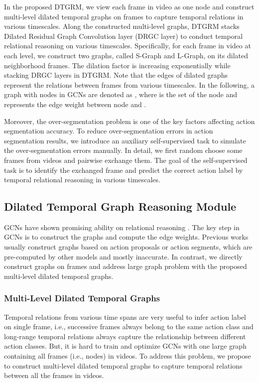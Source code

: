 \documentclass[letterpaper]{article} \usepackage{aaai21}  \usepackage{times}  \usepackage{helvet} \usepackage{courier}  \usepackage[hyphens]{url}  \usepackage{graphicx} \usepackage{mathtools}
\begin{document}
In the proposed DTGRM, we view each frame in video as one node and construct multi-level dilated temporal graphs on frames to capture temporal relations in various timescales. Along the constructed multi-level graphs, DTGRM stacks  Dilated Residual Graph Convolution layer (DRGC layer) to conduct temporal relational reasoning on various timescales. Specifically, for each frame in video at each level, we construct two graphs, called S-Graph and L-Graph, on its dilated neighborhood frames. The dilation factor is increasing exponentially while stacking DRGC layers in DTGRM. Note that the edges of dilated graphs represent the relations between frames from various timescales. In the following, a graph with  nodes in GCNs are denoted as , where  is the set of the node  and  represents the edge weight between node  and .

Moreover, the over-segmentation problem \cite{lea2016learning} is one of the key factors affecting action segmentation accuracy. To reduce over-segmentation errors in action segmentation results, we introduce an auxiliary self-supervised task to simulate the over-segmentation errors manually. In detail, we first random choose some frames from videos and pairwise exchange them. The goal of the self-supervised task is to identify the exchanged frame and predict the correct action label by temporal relational reasoning in various timescales.

\subsection{Dilated Temporal Graph Reasoning Module}
GCNs have shown promising ability on relational reasoning \cite{chen2019graph,hussein2019videograph,zeng2019graph}. The key step in GCNs is to construct the graphs and compute the edge weights. Previous works usually construct graphs based on action proposals or action segments, which are pre-computed by other models and mostly inaccurate. In contrast, we directly construct graphs on frames and address large graph problem with the proposed multi-level dilated temporal graphs.

\subsubsection{Multi-Level Dilated Temporal Graphs}
Temporal relations from various time spans are very useful to infer action label on single frame, i.e., successive frames always belong to the same action class and long-range temporal relations always capture the relationship between different action classes. But, it is hard to train and optimize GCNs with one large graph containing all frames (i.e., nodes) in videos. To address this problem, we propose to construct multi-level dilated temporal graphs to capture temporal relations between all the frames in videos.
\end{document}
